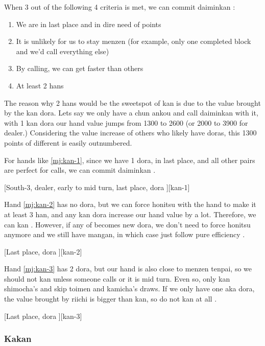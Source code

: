 \documentclass[12pt]{article}
\begin{document}
When 3 out of the following 4 criteria is met, we can commit daiminkan \citep[][p.~140]{kawamura-naki}:

\begin{enumerate}
\item We are in last place and in dire need of points
\item It is unlikely for us to stay menzen (for example, only one completed block and we'd call everything else)
\item By calling, we can get faster than others
\item At least 2 hans
\end{enumerate}

The reason why 2 hans would be the sweetspot of kan is due to the value brought by the kan dora. Lets say we only have a chun ankou and call daiminkan with it, with 1 kan dora our hand value jumps from 1300 to 2600 (or 2000 to 3900 for dealer.) Considering the value increase of others who likely have doras, this 1300 points of different is easily outnumbered.

For hands like \ref{mj:kan-1}, since we have 1 dora, in last place, and all other pairs are perfect for calls, we can commit  daiminkan \citep[][pp.~139--140]{kawamura-naki}.

[South-3, dealer, early to mid turn, last place, dora ][kan-1]

Hand \ref{mj:kan-2} has no dora, but we can force honitsu with the hand to make it at least 3 han, and any kan dora increase our hand value by a lot. Therefore, we can kan . However, if any of  becomes new dora, we don't need to force honitsu anymore and we still have mangan, in which case just follow pure efficiency \citep[][pp.~141--142]{kawamura-naki}.

[Last place, dora ][kan-2]

Hand \ref{mj:kan-3} has 2 dora, but our hand is also close to menzen tenpai, so we should not kan  unless someone calls or it is mid turn. Even so, only kan shimocha's  and skip toimen and kamicha's draws. If we only have one aka dora, the value brought by riichi is bigger than kan, so do not kan at all \citep[][pp.~141--142]{kawamura-naki}.

[Last place, dora ][kan-3]


\subsubsection*{Kakan}
\end{document}
